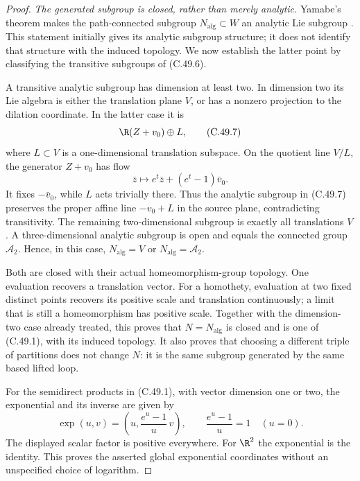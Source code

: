 \begin{proof}
\emph{The generated subgroup is closed, rather than merely analytic.}
Yamabe's theorem makes the path-connected subgroup
$N_{\mathrm{alg}}\subset W$ an analytic Lie subgroup
\cite[pp.~13--14]{C_Yamabe1950}.
This statement initially gives its analytic subgroup
structure; it does not identify that structure with the
induced topology. We now establish the latter point by
classifying the transitive subgroups of (C.49.6).

A transitive analytic subgroup has dimension at least two.
In dimension two its Lie algebra is either the translation
plane $V$, or has a nonzero projection to the dilation
coordinate. In the latter case it is
\[
                    \R(Z+v_0)\oplus L,                 \tag{C.49.7}
\]
where $L\subset V$ is a one-dimensional translation subspace.
On the quotient line $V/L$, the generator $Z+v_0$ has flow
\[
                 \bar z\longmapsto
                       e^t\bar z+(e^t-1)\bar v_0 .
 \]
It fixes $-\bar v_0$, while $L$ acts trivially there.
Thus the analytic subgroup in (C.49.7) preserves the proper
affine line $-v_0+L$ in the source plane, contradicting
transitivity. The remaining two-dimensional subgroup is
exactly all translations $V$.
A three-dimensional analytic subgroup is open and equals
the connected group $\mathcal A_2$.
Hence, in this case,
$N_{\mathrm{alg}}=V$ or $N_{\mathrm{alg}}=\mathcal A_2$.

Both are closed with their actual homeomorphism-group
topology. One evaluation recovers a translation vector.
For a homothety, evaluation at two fixed distinct points
recovers its positive scale and translation continuously;
a limit that is still a homeomorphism has positive scale.
Together with the dimension-two case already treated,
this proves that $N=N_{\mathrm{alg}}$ is closed and is
one of (C.49.1), with its induced topology.
It also proves that choosing a different triple of
partitions does not change $N$: it is the same subgroup
generated by the same based lifted loop.

For the semidirect products in (C.49.1), with vector
dimension one or two, the exponential and its inverse
are given by
\[
 \exp(u,v)=
   \left(u,\frac{e^u-1}{u}\,v\right),
 \qquad \frac{e^u-1}{u}=1\quad(u=0).                    \tag{C.49.8}
\]
The displayed scalar factor is positive everywhere.
For $\R^2$ the exponential is the identity.
This proves the asserted global exponential coordinates
without an unspecified choice of logarithm.


\end{proof}
